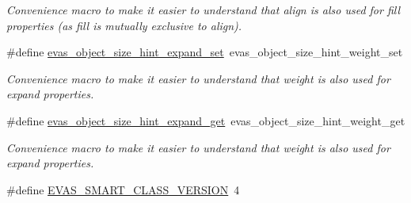 \begin{DoxyCompactItemize}
\begin{DoxyCompactList}\small\item\em Convenience macro to make it easier to understand that align is also used for fill properties (as fill is mutually exclusive to align). \item\end{DoxyCompactList}\item 
\#define \hyperlink{Evas_8h_ab239e77a0e38a5a756acbb0604055ecf}{evas\_\-object\_\-size\_\-hint\_\-expand\_\-set}~evas\_\-object\_\-size\_\-hint\_\-weight\_\-set\label{Evas_8h_ab239e77a0e38a5a756acbb0604055ecf}

\begin{DoxyCompactList}\small\item\em Convenience macro to make it easier to understand that weight is also used for expand properties. \item\end{DoxyCompactList}\item 
\#define \hyperlink{Evas_8h_a71adf20af9358d9d26b7c88b61d1fc8d}{evas\_\-object\_\-size\_\-hint\_\-expand\_\-get}~evas\_\-object\_\-size\_\-hint\_\-weight\_\-get\label{Evas_8h_a71adf20af9358d9d26b7c88b61d1fc8d}

\begin{DoxyCompactList}\small\item\em Convenience macro to make it easier to understand that weight is also used for expand properties. \item\end{DoxyCompactList}\item 
\#define \hyperlink{group__Evas__Smart__Group_ga1ca1514302a47188c921b232d6ce42db}{EVAS\_\-SMART\_\-CLASS\_\-VERSION}~4\label{group__Evas__Smart__Group_ga1ca1514302a47188c921b232d6ce42db}


\end{DoxyCompactItemize}
